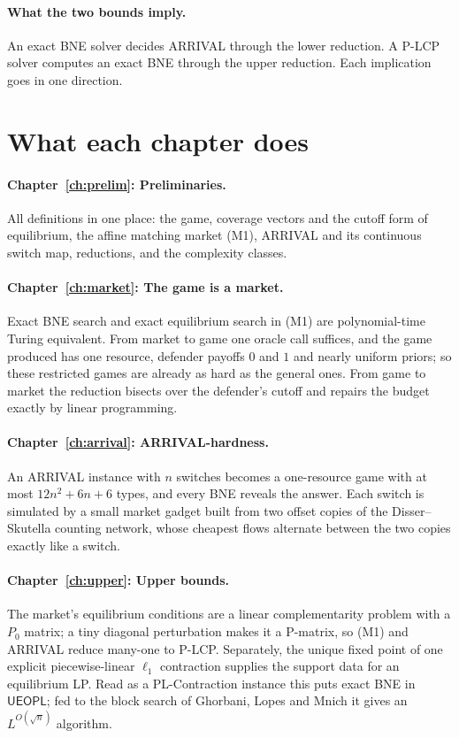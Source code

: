 \paragraph{What the two bounds imply.} An exact BNE solver decides
ARRIVAL through the lower reduction. A P-LCP solver computes an exact
BNE through the upper reduction. Each implication goes in one direction.

\section{What each chapter does}

\paragraph{Chapter~\ref{ch:prelim}: Preliminaries.} All definitions in one place: the game, coverage
vectors and the cutoff form of equilibrium, the affine matching market (M1), ARRIVAL and its continuous
switch map, reductions, and the complexity classes.

\paragraph{Chapter~\ref{ch:market}: The game is a market.} Exact BNE search and exact equilibrium search
in (M1) are polynomial-time Turing equivalent. From market to game one oracle call suffices, and the
game produced has one resource, defender payoffs $0$ and $1$ and nearly uniform priors; so these
restricted games are already as hard as the general ones. From game to market the reduction bisects over
the defender's cutoff and repairs the budget exactly by linear programming.

\paragraph{Chapter~\ref{ch:arrival}: ARRIVAL-hardness.} An ARRIVAL instance with $n$ switches becomes a
one-resource game with at most $12n^2+6n+6$ types, and every BNE reveals the answer. Each switch is
simulated by a small market gadget built from two offset copies of the Disser--Skutella counting
network, whose cheapest flows alternate between the two copies exactly like a switch.

\paragraph{Chapter~\ref{ch:upper}: Upper bounds.} The market's equilibrium conditions are a linear
complementarity problem with a $P_0$ matrix; a tiny diagonal perturbation makes it a P-matrix, so (M1)
and ARRIVAL reduce many-one to P-LCP. Separately, the unique fixed point
of one explicit piecewise-linear $\ell_1$ contraction supplies the support
data for an equilibrium LP. Read as a PL-Contraction instance this puts exact
BNE in $\mathsf{UEOPL}$; fed to the block search of Ghorbani, Lopes and Mnich it gives an
$L^{O(\sqrt n)}$ algorithm.

